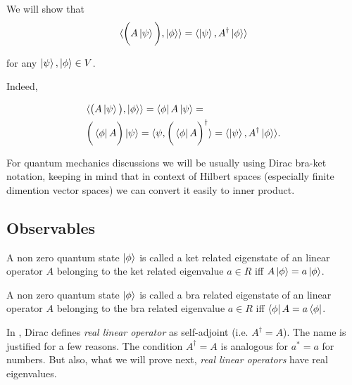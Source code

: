 \documentclass[main.tex]{subfiles}
\begin{document}
We will show that
\begin{equation}
\langle \bigg(A\ket{\psi}\bigg), \ket{\phi} \rangle = \langle \ket{\psi}, A^\dagger\ket{\phi} \rangle
\end{equation} 

for any $\ket{\psi}, \ket{\phi} \in V$.

Indeed,

\begin{align*}
& \langle \big(A\ket{\psi}\big), \ket{\phi} \rangle = \bra{\phi} A \ket{\psi} = \\ & \bigg(\bra{\phi} A\bigg) \ket{\psi} = \langle {\psi}, \bigg(\bra{\phi}A\bigg)^\dagger \rangle = \langle \ket{\psi}, A^\dagger\ket{\phi} \rangle.
\end{align*}

For quantum mechanics discussions we will be usually using Dirac bra-ket notation, keeping in mind that in context of Hilbert spaces (especially finite dimention vector spaces) we can convert it easily to inner product. 

\subsection{Observables}

\begin{definition}
A non zero quantum state $\ket{\phi}$ is called a ket related eigenstate of an linear operator $A$ belonging to the ket related eigenvalue $a \in R$ iff $A\ket{\phi} = a\ket{\phi}$.
\end{definition}

\begin{definition}
A non zero quantum state $\ket{\phi}$ is called a bra related eigenstate of an linear operator $A$ belonging to the bra related eigenvalue $a \in R$ iff $\bra{\phi}A = a\bra{\phi}$.
\end{definition}

In \cite{dirac1981}, Dirac defines \textit{real linear operator} as self-adjoint (i.e. $A^\dagger = A$). The name is justified for a few reasons. The condition $A^\dagger = A$ is analogous for $a^* = a$ for numbers. But also, what we will prove next, \textit{real linear operators} have real eigenvalues.
\end{document}
